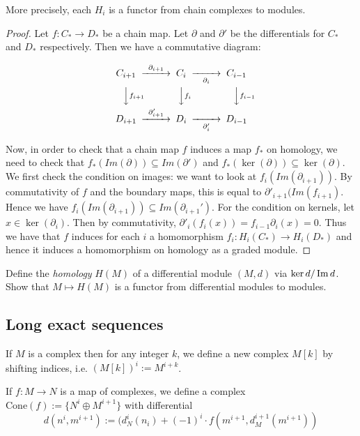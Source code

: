 More precisely, each $H_i$ is a functor from chain complexes to modules.
\begin{proof}
Let $f:C_*\rightarrow D_*$ be a chain map. Let $\partial$ and
$\partial'$ be the differentials for $C_*$ and $D_*$
respectively. Then we have a commutative diagram:

\begin{equation}
\begin{CD}
C_{i+1} @>\partial_{i+1}>> C_i @>>\partial_i> C_{i-1}\\
@VV f_{i+1} V          @VV f_i V             @VVf_{i-1} V\\
D_{i+1} @>\partial'_{i+1}>> D_i @>>\partial'_i> D_{i-1}
\end{CD}
\end{equation}

Now, in order to check that a chain map $f$ induces a map $f_*$
on homology, we need to check that $f_*(Im(\partial))\subseteq
Im(\partial')$ and $f_*(\ker(\partial))\subseteq
\ker(\partial)$. We first check the condition on images: we want
to look at $f_i(Im(\partial_{i+1}))$. By commutativity of $f$
and the boundary maps, this is equal to
$\partial'_{i+1}(Im(f_{i+1})$. Hence we have
$f_i(Im(\partial_{i+1}))\subseteq Im(\partial_{i+1}')$. For the
condition on kernels, let $x\in \ker(\partial_i)$. Then by
commutativity, $\partial'_i(f_i(x))=f_{i-1}\partial_i(x)=0$.
Thus we have that $f$ induces for each $i$ a homomorphism
$f_i:H_i(C_*)\rightarrow H_i(D_*)$ and hence it induces a
homomorphism on homology as a graded module. \end{proof}

\begin{exercise} 
Define the \emph{homology} $H(M)$ of a differential module $(M, d)$ via $\ker d / \operatorname{Im}
d$. Show that $M \mapsto H(M)$ is  a functor from differential modules to
modules.
\end{exercise} 


\subsection{Long exact sequences}

\begin{definition} If $M$ is a complex then for any integer $k$, we define a new complex $M[k]$ by shifting indices, i.e. $(M[k])^i:=M^{i+k}$.\end{definition}

\begin{definition} If $f:M\rightarrow N$ is a map of complexes, we define a complex $\mathrm{Cone}(f):=\{N^i\oplus M^{i+1}\}$ with differential
$$d(n^i,m^{i+1}):= (d_N^i(n_i)+(-1)^i\cdot f(m^{i+1}, d_M^{i+1}(m^{i+1}))$$
\end{definition}

